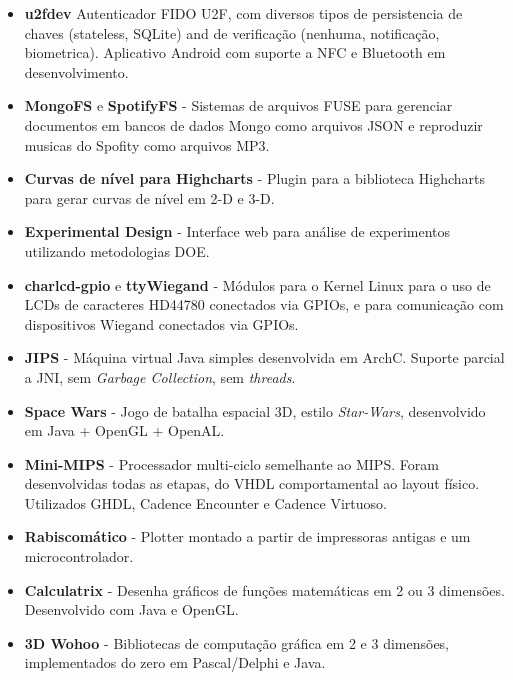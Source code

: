 \documentclass[a4paper,10pt]{article}
\begin{document}
    \begin{itemize}
      \item
        \textbf{u2fdev} Autenticador FIDO U2F, com diversos tipos de persistencia de chaves (stateless, SQLite) and de verificação (nenhuma, notificação, biometrica). Aplicativo Android com suporte a NFC e Bluetooth em desenvolvimento.

      \item
        \textbf{MongoFS} e \textbf{SpotifyFS} - Sistemas de arquivos FUSE para gerenciar documentos em bancos de dados Mongo como arquivos JSON e reproduzir musicas do Spofity como arquivos MP3.

      \item 
        \textbf{Curvas de nível para Highcharts} - Plugin para a biblioteca Highcharts para gerar curvas de nível em 2-D e 3-D.
      
      \item 
        \textbf{Experimental Design} - Interface web para análise de experimentos utilizando metodologias DOE.
        
      \item 
        \textbf{charlcd-gpio} e \textbf{ttyWiegand} - Módulos para o Kernel Linux para o uso de LCDs de caracteres HD44780 conectados via GPIOs, e para comunicação com dispositivos Wiegand conectados via GPIOs.

      \item 
        \textbf{JIPS} - Máquina virtual Java simples desenvolvida em ArchC. Suporte parcial a JNI, sem \emph{Garbage Collection}, sem \emph{threads}.

      \item 
        \textbf{Space Wars} - Jogo de batalha espacial 3D, estilo \emph{Star-Wars}, desenvolvido em Java + OpenGL + OpenAL.

      \item 
        \textbf{Mini-MIPS} - Processador multi-ciclo semelhante ao MIPS. Foram desenvolvidas todas as etapas, do VHDL comportamental ao layout físico. Utilizados GHDL, Cadence Encounter e Cadence Virtuoso.

      \item 
        \textbf{Rabiscomático} - Plotter montado a partir de impressoras antigas e um microcontrolador.

      \item 
        \textbf{Calculatrix} - Desenha gráficos de funções matemáticas em 2 ou 3 dimensões. Desenvolvido com Java e OpenGL.

      \item 
        \textbf{3D Wohoo} - Bibliotecas de computação gráfica em 2 e 3 dimensões, implementados do zero em Pascal/Delphi e Java.

    \end{itemize}
\end{document}
